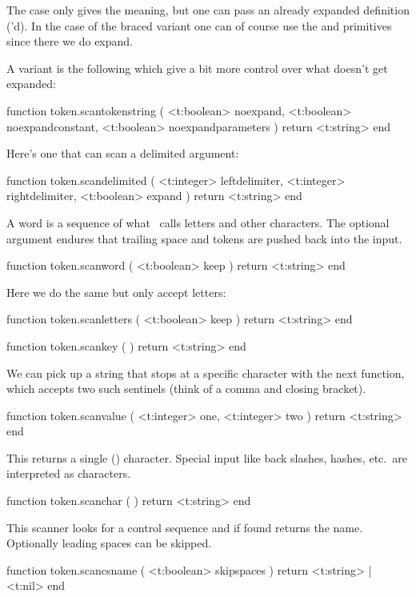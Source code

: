 The \type {\foo} case only gives the meaning, but one can pass an already
expanded definition (\type {\edef}'d). In the case of the braced variant one can
of course use the \type {\detokenize} and  primitives since
there we do expand.

A variant is the following which give a bit more control over what doesn't get
expanded:

\starttyping[option=LUA]
function token.scantokenstring (
    <t:boolean> noexpand,
    <t:boolean> noexpandconstant,
    <t:boolean> noexpandparameters
)
    return <t:string>
end
\stoptyping

Here's one that can scan a delimited argument:

\starttyping[option=LUA]
function token.scandelimited (
    <t:integer> leftdelimiter,
    <t:integer> rightdelimiter,
    <t:boolean> expand
)
    return <t:string>
end
\stoptyping

A word is a sequence of what \TEX\ calls letters and other characters. The
optional  argument endures that trailing space and \type {\relax}
tokens are pushed back into the input.

\starttyping[option=LUA]
function token.scanword ( <t:boolean> keep )
    return <t:string>
end
\stoptyping

Here we do the same but only accept letters:

\starttyping[option=LUA]
function token.scanletters ( <t:boolean> keep )
    return <t:string>
end
\stoptyping

\starttyping[option=LUA]
function token.scankey ( )
    return <t:string>
end
\stoptyping

We can pick up a string that stops at a specific character with the next
function, which accepts two such sentinels (think of a comma and closing
bracket).

\starttyping[option=LUA]
function token.scanvalue ( <t:integer> one, <t:integer> two )
    return <t:string>
end
\stoptyping

This returns a single (\UTF) character. Special input like back slashes, hashes,
etc.\ are interpreted as characters.

\starttyping[option=LUA]
function token.scanchar ( )
    return <t:string>
end
\stoptyping

This scanner looks for a control sequence and if found returns the name.
Optionally leading spaces can be skipped.

\starttyping[option=LUA]
function token.scancsname ( <t:boolean> skipspaces )
    return <t:string> | <t:nil>
end
\stoptyping

